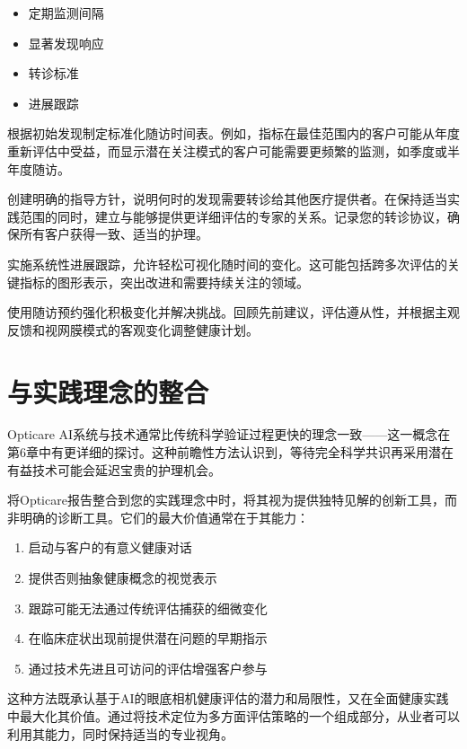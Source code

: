 \documentclass[
  Letterpaper,
]{scrbook}
\providecommand{\tightlist}{%
  \setlength{\itemsep}{0pt}\setlength{\parskip}{0pt}}\usepackage{longtable,booktabs,array}
\begin{document}
\begin{itemize}
\tightlist
\item
  定期监测间隔
\item
  显著发现响应
\item
  转诊标准
\item
  进展跟踪
\end{itemize}

根据初始发现制定标准化随访时间表。例如，指标在最佳范围内的客户可能从年度重新评估中受益，而显示潜在关注模式的客户可能需要更频繁的监测，如季度或半年度随访。

创建明确的指导方针，说明何时的发现需要转诊给其他医疗提供者。在保持适当实践范围的同时，建立与能够提供更详细评估的专家的关系。记录您的转诊协议，确保所有客户获得一致、适当的护理。

实施系统性进展跟踪，允许轻松可视化随时间的变化。这可能包括跨多次评估的关键指标的图形表示，突出改进和需要持续关注的领域。

使用随访预约强化积极变化并解决挑战。回顾先前建议，评估遵从性，并根据主观反馈和视网膜模式的客观变化调整健康计划。

\section{与实践理念的整合}\label{ux4e0eux5b9eux8df5ux7406ux5ff5ux7684ux6574ux5408}

Opticare
AI系统与技术通常比传统科学验证过程更快的理念一致------这一概念在第6章中有更详细的探讨。这种前瞻性方法认识到，等待完全科学共识再采用潜在有益技术可能会延迟宝贵的护理机会。

将Opticare报告整合到您的实践理念中时，将其视为提供独特见解的创新工具，而非明确的诊断工具。它们的最大价值通常在于其能力：

\begin{enumerate}
\def\labelenumi{\arabic{enumi}.}
\tightlist
\item
  启动与客户的有意义健康对话
\item
  提供否则抽象健康概念的视觉表示
\item
  跟踪可能无法通过传统评估捕获的细微变化
\item
  在临床症状出现前提供潜在问题的早期指示
\item
  通过技术先进且可访问的评估增强客户参与
\end{enumerate}

这种方法既承认基于AI的眼底相机健康评估的潜力和局限性，又在全面健康实践中最大化其价值。通过将技术定位为多方面评估策略的一个组成部分，从业者可以利用其能力，同时保持适当的专业视角。
\end{document}
